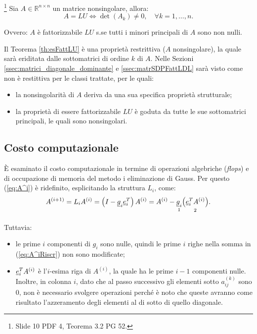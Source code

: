 \begin{theorem}\footnote{Slide 10 PDF 4, Teorema 3.2 PG 52.}\label{th:esFattLU}
    Sia $A\in\mathbb R^{n\times n}$ un matrice nonsingolare, allora:
    \begin{equation*}
        A = LU \iff \det(A_k)\neq 0,\quad \forall k=1,\hdots, n.
    \end{equation*}
\end{theorem}
Ovvero: $A$ è fattorizzabile $LU$ s.se tutti i minori principali di $A$ sono non nulli.

\begin{remark}
    Il Teorema \ref{th:esFattLU} è una proprietà restrittiva ($A$ nonsingolare), la quale sarà eriditata dalle sottomatrici di ordine $k$ di $A$. Nelle Sezioni \ref{ssec:matrici_diagonale_dominante} e \ref{ssec:matrSDPFattLDL} sarà visto come non è restittiva per le classi trattate, per le quali:
    \begin{itemize}
        \item la nonsingolarità di $A$ deriva da una sua specifica proprietà strutturale;
        \item la proprietà di essere fattorizzabile $LU$ è goduta da tutte le sue sottomatrici principali, le quali sono nonsingolari.
    \end{itemize}
\end{remark}

\subsection{Costo computazionale}
È esaminato il costo computazionale in termine di operazioni algebriche (\textit{flops}) e di occupazione di memoria del metodo i eliminazione di Gauss. Per questo (\ref{eq:A^i}) è ridefinito, esplicitando la struttura $L_i$, come:
\begin{equation}\label{eq:A^iRiscr}
    A^{(i+1)} = L_iA^{(i)} = \left(I-\uline g_i \uline e_i^T\right)A^{(i)} = A^{(i)} - \underset{\footnotemark}{\uline g_i} \underset{\footnotemark}{\left(\uline e_i^T A^{(i)}\right)}.
\end{equation}

\addtocounter{footnote}{-1}


Tuttavia:
\begin{itemize}
    \item le prime $i$ componenti di $g_i$ sono nulle, quindi le prime $i$ righe nella somma in (\ref{eq:A^iRiscr}) non sono modificate;
    \item $\uline e_i^T A^{(i)}$ è l'$i$-esima riga di $A^{(i)}$, la quale ha le prime $i-1$ componenti nulle. Inoltre, in colonna $i$, dato che al passo successivo gli elementi sotto $a_{ij}^{(k)}$ sono 0, non è necessario svolgere operazioni perché è noto che queste avranno come risultato l'azzeramento degli elementi al di sotto di quello diagonale.
\end{itemize}

